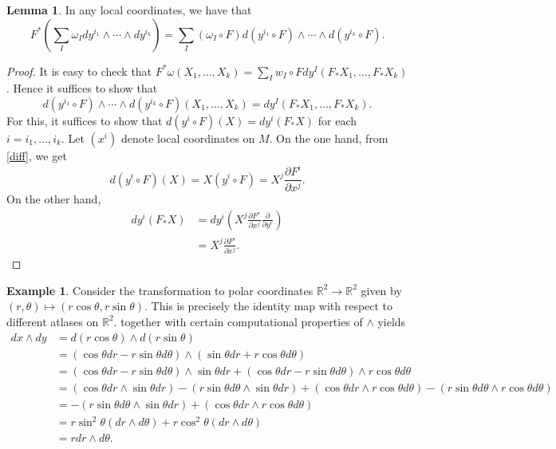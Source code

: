 \documentclass[10pt,letterpaper,cm]{nupset}
\theoremstyle{definition}
\newtheorem{exmp}[definition]{Example}
\theoremstyle{theorem}
\newtheorem{lemma}[definition]{Lemma}
\theoremstyle{remark}
\newcommand{\R}{\mathbb R}
\newcommand{\1}{\mathbf{1}}
\newcommand{\0}{\vec 0}
\begin{document}
\begin{lemma}\label{natpull}
In any local coordinates, we have that $$F^{\ast}\left(\sum_I \omega_I dy^{i_1} \wedge \cdots \wedge dy^{i_k}\right) = \sum_I \left(\omega_I \circ F\right)d\left(y^{i_1} \circ F\right) \wedge \cdots \wedge d\left(y^{i_k} \circ F\right).$$
\end{lemma}
\begin{proof}
It is easy to check that $F^{\ast}{\omega}\left(X_1, \ldots, X_k\right) = \sum_Iw_I\circ Fdy^I\left(F_{\ast}{X_1}, \ldots, F_{\ast}{X_k}\right)$. Hence it suffices to show that 
\[
d\left(y^{i_1} \circ F\right) \wedge \cdots \wedge d\left(y^{i_k} \circ F\right)\left(X_1, \ldots, X_k\right) = dy^I\left(F_{\ast}{X_1}, \ldots, F_{\ast}{X_k}\right).
\] For this, it suffices to show that $d\left(y^i \circ F\right)(X) = dy^i\left(F_{\ast}{X}\right)$ for each $i = i_1, \ldots, i_k$. Let $\left(x^i\right)$ denote local coordinates on $M$. On the one hand, from \cref{diff}, we get
\[
d\left(y^i \circ F\right)(X)  = X\left(y^i \circ F\right)
= X^j\frac{\partial{F^i}}{\partial{x^j}}
. \]
On the other hand,
\begin{align*}
dy^i\left(F_{\ast}{X}\right) & = dy^i\left(X^j\frac{\partial{F^r}}{\partial{x^j}}\frac{\partial}{\partial{y^r}}    \right)
\\ & = X^j\frac{\partial{F^i}}{\partial{x^j}}
.\end{align*}
\end{proof}



\begin{exmp}
Consider the transformation to polar coordinates $\R^2 \to \R^2$ given by $\left(r, \theta\right) \mapsto \left(r\cos \theta, r\sin \theta\right)$. This is precisely the identity map with respect to different atlases on $\R^2$.  together with certain computational properties of $\wedge$ yields
\begin{align*}  dx \wedge dy & = d(r\cos \theta) \wedge d(r\sin \theta) \\ &=   (\cos \theta dr - r\sin \theta d\theta) \wedge (\sin \theta dr +r \cos \theta d\theta) \\ &= (\cos \theta dr - r\sin \theta d\theta) \wedge \sin \theta dr + (\cos \theta dr - r\sin \theta d\theta) \wedge r \cos \theta d\theta \\ & = (\cos \theta dr \wedge \sin \theta dr) - (r \sin \theta d \theta \wedge \sin \theta dr) +  (\cos \theta dr \wedge r \cos \theta d\theta) - (r\sin \theta d \theta \wedge r \cos \theta d \theta)\\ & =  {-(r \sin \theta d \theta \wedge \sin \theta dr)} +  (\cos \theta dr \wedge r \cos \theta d\theta) \\ & = r\sin^2\theta(dr \wedge d\theta) + r\cos^2 \theta(dr \wedge d\theta)\\ & = rdr \wedge d\theta.
\end{align*}
\end{exmp}
\end{document}
